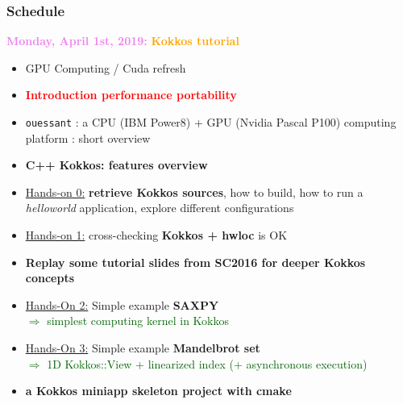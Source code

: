 \begin{frame}
  \frametitle{Schedule}

  {\bf \large \textcolor{violet}{Monday, April 1st, 2019:}} \textcolor{orange}{\bf Kokkos tutorial}
  \begin{itemize}
  \item GPU Computing / Cuda refresh %
  \item \textcolor{red}{\bf Introduction performance portability} %
  \item \texttt{ouessant} : a CPU (IBM Power8) + GPU (Nvidia Pascal P100) computing platform : short overview %
  \item \textbf{C++ Kokkos: features overview} %
  \item \textcolor{blue}{\hyperlink{handson0}{Hands-on 0:}} \textbf{retrieve Kokkos sources}, how to build, how to run a \textit{helloworld} application, explore different configurations %
  \item \textcolor{blue}{\hyperlink{handson1}{Hands-on 1:}} cross-checking \textbf{Kokkos + hwloc} is OK
  \item \textbf{Replay some tutorial slides from SC2016 for deeper Kokkos concepts}
  \item \textcolor{blue}{\hyperlink{handson2}{Hands-On 2:}} Simple example \textbf{SAXPY}\\
    \textcolor{darkgreen}{$\Rightarrow$ simplest computing kernel in Kokkos} %
  \item \textcolor{blue}{\hyperlink{handson3}{Hands-On 3:}} Simple example \textbf{Mandelbrot set}\\
    \textcolor{darkgreen}{$\Rightarrow$ 1D Kokkos::View + linearized index (+ asynchronous execution)} %
  \item {\bf a Kokkos miniapp skeleton project with cmake} 
  \end{itemize}
\end{frame}


